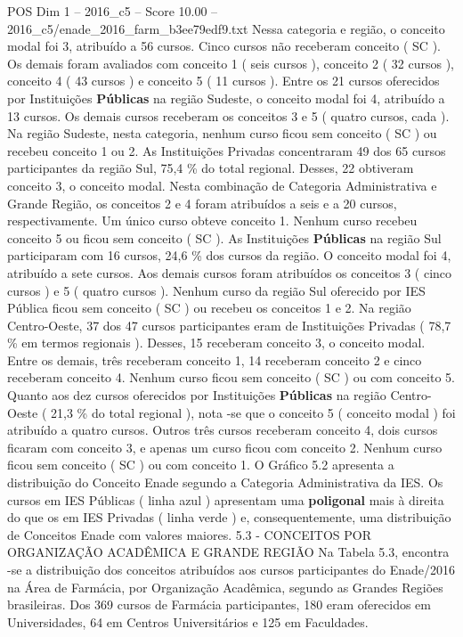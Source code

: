 \begin{textsample}{POS Dim 1 – 2016\_c5 – Score 10.00 – 2016\_c5/enade\_2016\_farm\_b3ee79edf9.txt}
Nessa categoria e região, o conceito modal foi 3, atribuído a 56 cursos.
Cinco cursos não receberam conceito ( SC ).
Os demais foram avaliados com conceito 1 ( seis cursos ), conceito 2 ( 32 cursos ), conceito 4 ( 43 cursos ) e conceito 5 ( 11 cursos ).
Entre os 21 cursos oferecidos por Instituições \textbf{Públicas} na região Sudeste, o conceito modal foi 4, atribuído a 13 cursos.
Os demais cursos receberam os conceitos 3 e 5 ( quatro cursos, cada ).
Na região Sudeste, nesta categoria, nenhum curso ficou sem conceito ( SC ) ou recebeu conceito 1 ou 2.
As Instituições Privadas concentraram 49 dos 65 cursos participantes da região Sul, 75,4 \% do total regional.
Desses, 22 obtiveram conceito 3, o conceito modal.
Nesta combinação de Categoria Administrativa e Grande Região, os conceitos 2 e 4 foram atribuídos a seis e a 20 cursos, respectivamente.
Um único curso obteve conceito 1.
Nenhum curso recebeu conceito 5 ou ficou sem conceito ( SC ).
As Instituições \textbf{Públicas} na região Sul participaram com 16 cursos, 24,6 \% dos cursos da região.
O conceito modal foi 4, atribuído a sete cursos.
Aos demais cursos foram atribuídos os conceitos 3 ( cinco cursos ) e 5 ( quatro cursos ).
Nenhum curso da região Sul oferecido por IES Pública ficou sem conceito ( SC ) ou recebeu os conceitos 1 e 2.
Na região Centro-Oeste, 37 dos 47 cursos participantes eram de Instituições Privadas ( 78,7 \% em termos regionais ).
Desses, 15 receberam conceito 3, o conceito modal.
Entre os demais, três receberam conceito 1, 14 receberam conceito 2 e cinco receberam conceito 4.
Nenhum curso ficou sem conceito ( SC ) ou com conceito 5.
Quanto aos dez cursos oferecidos por Instituições \textbf{Públicas} na região Centro-Oeste ( 21,3 \% do total regional ), nota -se que o conceito 5 ( conceito modal ) foi atribuído a quatro cursos.
Outros três cursos receberam conceito 4, dois cursos ficaram com conceito 3, e apenas um curso ficou com conceito 2.
Nenhum curso ficou sem conceito ( SC ) ou com conceito 1.
O Gráfico 5.2 apresenta a distribuição do Conceito Enade segundo a Categoria Administrativa da IES.
Os cursos em IES Públicas ( linha azul ) apresentam uma \textbf{poligonal} mais à direita do que os em IES Privadas ( linha verde ) e, consequentemente, uma distribuição de Conceitos Enade com valores maiores. 5.3 - CONCEITOS POR ORGANIZAÇÃO ACADÊMICA E GRANDE REGIÃO Na Tabela 5.3, encontra -se a distribuição dos conceitos atribuídos aos cursos participantes do Enade/2016 na Área de Farmácia, por Organização Acadêmica, segundo as Grandes Regiões brasileiras.
Dos 369 cursos de Farmácia participantes, 180 eram oferecidos em Universidades, 64 em Centros Universitários e 125 em Faculdades.

\end{textsample}
